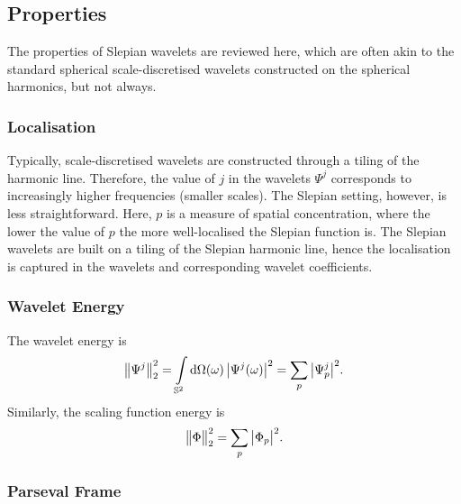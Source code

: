 

\subsection{Properties}\label{sec:chapter4_properties}

The properties of Slepian wavelets are reviewed here, which are often akin to the standard spherical scale-discretised wavelets constructed on the spherical harmonics, but not always.

\subsubsection{Localisation}\label{sec:chapter4_localisation}

Typically, scale-discretised wavelets are constructed through a tiling of the harmonic line.
Therefore, the value of \(j\) in the wavelets \(\Psi^{j}\) corresponds to increasingly higher frequencies (smaller scales).
The Slepian setting, however, is less straightforward.
Here, \(p\) is a measure of spatial concentration, where the lower the value of \(p\) the more well-localised the Slepian function is.
The Slepian wavelets are built on a tiling of the Slepian harmonic line, hence the localisation is captured in the wavelets and corresponding wavelet coefficients.

\subsubsection{Wavelet Energy}

The wavelet energy is
%
\begin{equation}
	{\big\lVert\Psi^{j}\big\rVert}_{2}^{2}
	= \displaystyle\int\limits_{\mathbb{S}^{2}} \dd{\Omega(\omega)} \big\lvert\Psi^{j}(\omega)\big\rvert^{2}
	= \displaystyle\sum\limits_{p} \big\lvert{\Psi}_{p}^{j}\big\rvert^{2}.
\end{equation}
%
Similarly, the scaling function energy is
%
\begin{equation}
	{\big\lVert\Phi\big\rVert}_{2}^{2}
	= \displaystyle\sum\limits_{p} \big\lvert{\Phi}_{p}\big\rvert^{2}.
\end{equation}

\subsubsection{Parseval Frame}

